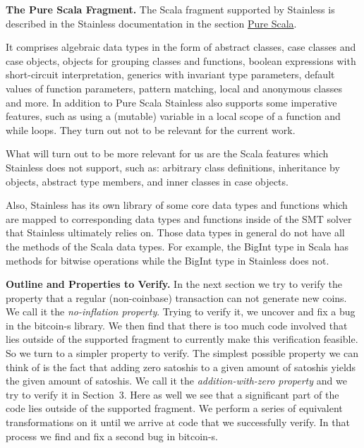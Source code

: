 \documentclass[runningheads]{llncs}
\renewcommand{\paragraph}{\textbf}%
\begin{document}
\paragraph{The Pure Scala Fragment.} The Scala fragment supported by
Stainless is described in the Stainless documentation
\cite{Stainless:documentation} in the section
\href{https://epfl-lara.github.io/stainless/purescala.html}{Pure
  Scala}.

It comprises algebraic data types in the form of abstract classes,
case classes and case objects, objects for grouping classes and
functions, boolean expressions with short-circuit interpretation,
generics with invariant type parameters, default values of function
parameters, pattern matching, local and anonymous classes and more.
In addition to Pure Scala Stainless also supports some imperative
features, such as using a (mutable) variable in a local scope of a
function and while loops. They turn out not to be relevant for the
current work.

What will turn out to be more relevant for us are the Scala features
which Stainless does not support, such as: arbitrary class
definitions, inheritance by objects, abstract type members, and inner
classes in case objects.

Also, Stainless has its own library of some core data types and
functions which are mapped to corresponding data types and functions
inside of the SMT solver that Stainless ultimately relies on. Those
data types in general do not have all the methods of the Scala data
types. For example, the BigInt type in Scala has methods for bitwise
operations while the BigInt type in Stainless does not.

\paragraph{Outline and Properties to Verify.} In the next section we
try to verify the property that a regular (non-coinbase) transaction
can not generate new coins. We call it the \emph{no-inflation
  property}. Trying to verify it, we uncover and fix a bug in the
bitcoin-s library. We then find that there is too much code involved
that lies outside of the supported fragment to currently make this
verification feasible. So we turn to a simpler property to verify. The
simplest possible property we can think of is the fact that adding
zero satoshis to a given amount of satoshis yields the given amount of
satoshis. We call it the \emph{addition-with-zero property} and we try
to verify it in Section~3. Here as well we see that a significant part
of the code lies outside of the supported fragment. We perform a
  series of equivalent transformations on it until we arrive at code that we
  successfully verify. In that process we find and fix a second bug in
  bitcoin-s.
\end{document}
